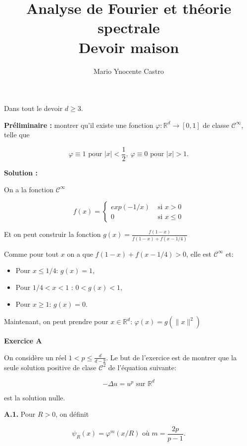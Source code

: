 \documentclass[10pt,a4paper,oneside]{article}
\begin{document}
\title{Analyse de Fourier et théorie spectrale \\ Devoir maison}
\author{Mario Ynocente Castro}

\maketitle

Dans tout le devoir $d \geq 3$.

\textbf{Préliminaire :} montrer qu'il existe une fonction $\varphi : \mathbb{R}^d \to [0,1]$ de classe $\mathcal{C}^\infty$, telle que

\[ \varphi \equiv 1 \text{ pour } |x| < \frac{1}{2},\ \varphi \equiv 0 \text{ pour } |x| > 1. \]

\textbf{Solution :}

On a la fonction $\mathcal{C}^\infty$

\[f(x) = \begin{cases}
exp(-1/x) &\text{ si } x > 0 \\
0 &\text{ si } x \leq 0
\end{cases}\]

Et on peut construir la fonction $\boxed{g(x) = \frac{f(1 - x)}{f(1 - x) + f(x - 1/4)}}$

Comme pour tout $x$ on a que $f(1 - x) + f(x - 1/4) > 0$, elle est $\mathcal{C}^\infty$ et:

\begin{itemize}
\item
Pour $x \leq 1/4$: $g(x) = 1$,
\item
Pour $1/4 < x < 1$ : $0 < g(x) < 1$,
\item
Pour $x \geq 1$: $g(x) = 0$.
\end{itemize}

Maintenant, on peut prendre pour $x \in \mathbb{R}^d$: $\boxed{\varphi(x) = g(\| x \|^2)}$

\begin{center}
\textbf{Exercice A}
\end{center}

On considère un réel $1 < p \leq \frac{d}{d - 2}$. Le but de l'exercice est de montrer que la seule solution positive de clase $\mathcal{C}^2$ de l'équation suivante:

\[ -\Delta u = u^p \text{ sur } \mathbb{R}^d \label{eq:A} \tag{1} \]

est la solution nulle.

\textbf{A.1.} Pour $R > 0$, on définit

\[ \psi_R(x) = \varphi^m(x / R) \text{ où } m = \frac{2p}{p - 1}. \]
\end{document}

